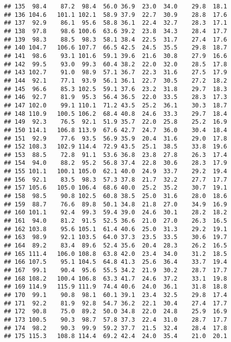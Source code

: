 \documentclass[
]{book}
\theoremstyle{definition}
\theoremstyle{definition}
\theoremstyle{definition}
\theoremstyle{definition}
\theoremstyle{remark}
\begin{document}
\begin{verbatim}
## 135  98.4    87.2  98.4  56.0 36.9  23.0  34.0    29.8  18.1
## 136 104.6   101.1 102.1  58.9 37.9  22.7  30.9    28.8  17.6
## 137  92.9    86.1  95.6  58.8 36.1  22.4  32.7    28.3  17.1
## 138  97.8    98.6 100.6  63.6 39.2  23.8  34.3    28.4  17.7
## 139  98.3    88.5  98.3  58.1 38.4  22.5  31.7    27.4  17.6
## 140 104.7   106.6 107.7  66.5 42.5  24.5  35.5    29.8  18.7
## 141  98.6    93.1 101.6  59.1 39.6  21.6  30.8    27.9  16.6
## 142  99.5    93.0  99.3  60.4 38.2  22.0  32.0    28.5  17.8
## 143 102.7    91.0  98.9  57.1 36.7  22.3  31.6    27.5  17.9
## 144  92.1    77.1  93.9  56.1 36.1  22.7  30.5    27.2  18.2
## 145  96.6    85.3 102.5  59.1 37.6  23.2  31.8    29.7  18.3
## 146  92.7    81.9  95.3  56.4 36.5  22.0  33.5    28.3  17.3
## 147 102.0    99.1 110.1  71.2 43.5  25.2  36.1    30.3  18.7
## 148 110.9   100.5 106.2  68.4 40.8  24.6  33.3    29.7  18.4
## 149  92.3    76.5  92.1  51.9 35.7  22.0  25.8    25.2  16.9
## 150 114.1   106.8 113.9  67.6 42.7  24.7  36.0    30.4  18.4
## 151  92.9    77.6  93.5  56.9 35.9  20.4  31.6    29.0  17.8
## 152 108.3   102.9 114.4  72.9 43.5  25.1  38.5    33.8  19.6
## 153  88.5    72.8  91.1  53.6 36.8  23.8  27.8    26.3  17.4
## 154  94.0    88.2  95.2  56.8 37.4  22.8  30.6    28.3  17.9
## 155 101.1   100.1 105.0  62.1 40.0  24.9  33.7    29.2  19.4
## 156  92.1    83.5  98.3  57.3 37.8  21.7  32.2    27.7  17.7
## 157 105.6   105.0 106.4  68.6 40.0  25.2  35.2    30.7  19.1
## 158  98.5    90.8 102.5  60.8 38.5  25.0  31.6    28.0  18.6
## 159  88.7    76.6  89.8  50.1 34.8  21.8  27.0    34.9  16.9
## 160 101.1    92.4  99.3  59.4 39.0  24.6  30.1    28.2  18.2
## 161  94.0    81.2  91.5  52.5 36.6  21.0  27.0    26.3  16.5
## 162 103.8    95.6 105.1  61.4 40.6  25.0  31.3    29.2  19.1
## 163  98.9    92.1 103.5  64.0 37.3  23.5  33.5    30.6  19.7
## 164  89.2    83.4  89.6  52.4 35.6  20.4  28.3    26.2  16.5
## 165 111.4   106.0 108.8  63.8 42.0  23.4  34.0    31.2  18.5
## 166 107.5    95.1 104.5  64.8 41.3  25.6  36.4    33.7  19.4
## 167  99.1    90.4  95.6  55.5 34.2  21.9  30.2    28.7  17.7
## 168 108.2   100.4 106.8  63.3 41.7  24.6  37.2    33.1  19.8
## 169 114.9   115.9 111.9  74.4 40.6  24.0  36.1    31.8  18.8
## 170  99.1    90.8  98.1  60.1 39.1  23.4  32.5    29.8  17.4
## 171  92.2    81.9  92.8  54.7 36.2  22.1  30.4    27.4  17.7
## 172  90.8    75.0  89.2  50.0 34.8  22.0  24.8    25.9  16.9
## 173 100.5    90.3  98.7  57.8 37.3  22.4  31.0    28.7  17.7
## 174  98.2    90.3  99.9  59.2 37.7  21.5  32.4    28.4  17.8
## 175 115.3   108.8 114.4  69.2 42.4  24.0  35.4    21.0  20.1

\end{verbatim}
\end{document}
